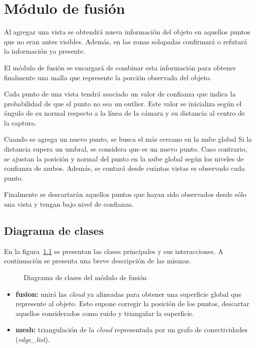 \chapter{Módulo de fusión}
	Al agregar una vista se obtendrá nueva información del objeto en aquellos
	puntos que no eran antes visibles.
	Además, en las zonas solapadas confirmará o refutará la información ya presente.

	El módulo de fusión se encargará de combinar esta información para obtener
	finalmente una malla que represente la porción observada del objeto.

	Cada punto de una vista tendrá asociado un valor de confianza que indica la
	probabilidad de que el punto no sea un outlier.
	Este valor se inicializa según el ángulo de su normal respecto a la línea
	de la cámara y su distancia al centro de la captura.

	Cuando se agrega un nuevo punto, se busca el más cercano en la nube global
	Si la distancia supera un umbral, se considera que es un nuevo punto. Caso
	contrario, se ajustan la posición y normal del punto en la nube global
	según los niveles de confianza de ambos.  Además, se contará desde cuántas
	vistas es observado cada punto.


	Finalmente se descartarán aquellos puntos que hayan sido observados desde sólo una vista y tengan bajo nivel de confianza.

	\section{Diagrama de clases}
		En la figura~\ref{fig:fusion_class} se presentan las clases principales y sus interacciones.
		A continuación se presenta una breve descripción de las mismas.
		\begin{figure}
			\caption{\label{fig:fusion_class}Diagrama de clases del módulo de fusión}
		\end{figure}

		\begin{itemize}
			\item {\bfseries fusion:} unirá las \emph{cloud} ya alineadas para
				obtener una superficie global que represente al objeto.
				Esto supone corregir la posición de los puntos, descartar
				aquellos considerados como ruido y triangular la superficie.
			\item {\bfseries mesh:} triangulación de la \emph{cloud} representada por un grafo de conectividades (\emph{edge\_list}).
		\end{itemize}



